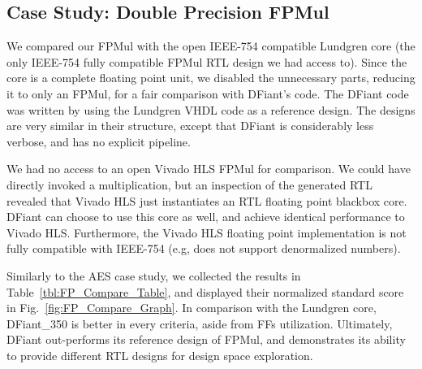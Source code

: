            
\subsection{Case Study: Double Precision FPMul}

We compared our FPMul with the open IEEE-754 compatible Lundgren core \cite{lundgren2014open} (the only IEEE-754 fully compatible FPMul RTL design we had access to). Since the core is a complete floating point unit, we disabled the unnecessary parts, reducing it to only an FPMul, for a fair comparison with DFiant's code. The DFiant code was written by using the Lundgren VHDL code as a reference design. The designs are very similar in their structure, except that DFiant is considerably less verbose, and has no explicit pipeline.

We had no access to an open Vivado HLS FPMul for comparison. We could have directly invoked a  multiplication, but an inspection of the generated RTL revealed that Vivado HLS just instantiates an RTL floating point blackbox core. DFiant can choose to use this core as well, and achieve identical performance to Vivado HLS. Furthermore, the Vivado HLS floating point implementation is not fully compatible with IEEE-754 (e.g, does not support denormalized numbers).

Similarly to the AES case study, we collected the results in Table~\ref{tbl:FP_Compare_Table}, and displayed their normalized standard score in Fig.~\ref{fig:FP_Compare_Graph}. In comparison with the Lundgren core, DFiant\_350 is better in every criteria, aside from FFs utilization. Ultimately, DFiant out-performs its reference design of FPMul, and demonstrates its ability to provide different RTL designs for design space exploration.

